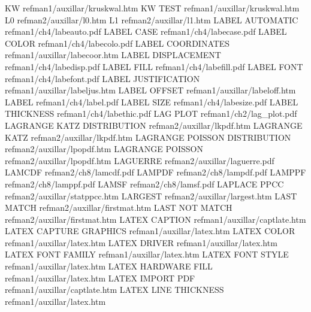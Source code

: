 KW                                      refman1/auxillar/kruskwal.htm
KW TEST                                 refman1/auxillar/kruskwal.htm
L0                                      refman2/auxillar/l0.htm
L1                                      refman2/auxillar/l1.htm
LABEL AUTOMATIC                         refman1/ch4/labeauto.pdf
LABEL CASE                              refman1/ch4/labecase.pdf
LABEL COLOR                             refman1/ch4/labecolo.pdf
LABEL COORDINATES                       refman1/auxillar/labecoor.htm
LABEL DISPLACEMENT                      refman1/ch4/labedisp.pdf
LABEL FILL                              refman1/ch4/labefill.pdf
LABEL FONT                              refman1/ch4/labefont.pdf
LABEL JUSTIFICATION                     refman1/auxillar/labeljus.htm
LABEL OFFSET                            refman1/auxillar/labeloff.htm
LABEL                                   refman1/ch4/label.pdf
LABEL SIZE                              refman1/ch4/labesize.pdf
LABEL THICKNESS                         refman1/ch4/labethic.pdf
LAG PLOT                                refman1/ch2/lag_plot.pdf
LAGRANGE KATZ DISTRIBUTION              refman2/auxillar/lkpdf.htm
LAGRANGE KATZ                           refman2/auxillar/lkpdf.htm
LAGRANGE POISSON DISTRIBUTION           refman2/auxillar/lpopdf.htm
LAGRANGE POISSON                        refman2/auxillar/lpopdf.htm
LAGUERRE                                refman2/auxillar/laguerre.pdf
LAMCDF                                  refman2/ch8/lamcdf.pdf
LAMPDF                                  refman2/ch8/lampdf.pdf
LAMPPF                                  refman2/ch8/lamppf.pdf
LAMSF                                   refman2/ch8/lamsf.pdf
LAPLACE PPCC                            refman2/auxillar/statppcc.htm
LARGEST                                 refman2/auxillar/largest.htm
LAST MATCH                              refman2/auxillar/firstmat.htm
LAST NOT MATCH                          refman2/auxillar/firstmat.htm
LATEX CAPTION                           refman1/auxillar/captlate.htm
LATEX CAPTURE GRAPHICS                  refman1/auxillar/latex.htm
LATEX COLOR                             refman1/auxillar/latex.htm
LATEX DRIVER                            refman1/auxillar/latex.htm
LATEX FONT FAMILY                       refman1/auxillar/latex.htm
LATEX FONT STYLE                        refman1/auxillar/latex.htm
LATEX HARDWARE FILL                     refman1/auxillar/latex.htm
LATEX IMPORT PDF                        refman1/auxillar/captlate.htm
LATEX LINE THICKNESS                    refman1/auxillar/latex.htm

